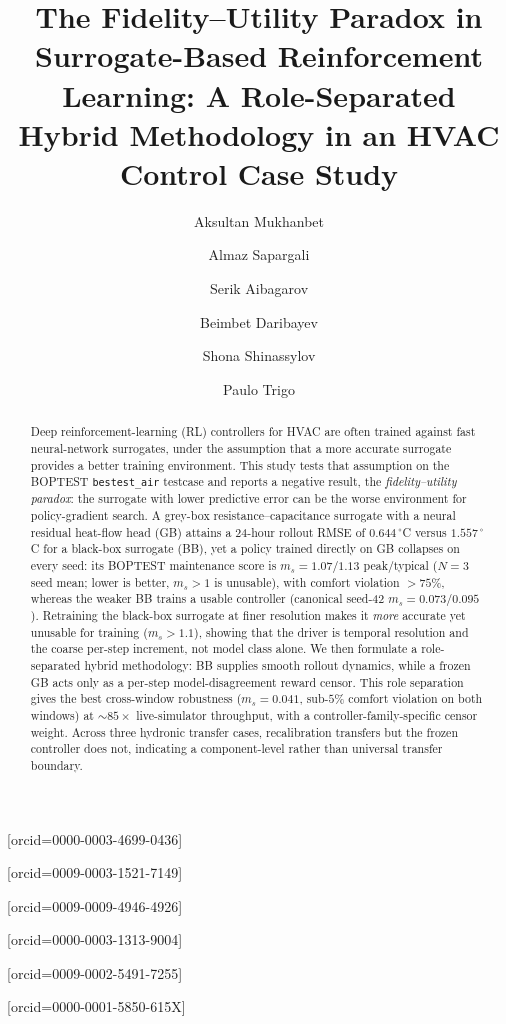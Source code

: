 \documentclass[a4paper,fleqn]{cas-sc}
\begin{document}
\let\WriteBookmarks\relax


\title[mode=title]{The Fidelity--Utility Paradox in Surrogate-Based Reinforcement Learning: A Role-Separated Hybrid Methodology in an HVAC Control Case Study}

\author[1]{Aksultan Mukhanbet}[orcid=0000-0003-4699-0436]
\author[2,1]{Almaz Sapargali}[orcid=0009-0003-1521-7149]
\cormark[1]
\author[2,1]{Serik Aibagarov}[orcid=0009-0009-4946-4926]
\author[3]{Beimbet Daribayev}[orcid=0000-0003-1313-9004]
\author[2,1]{Shona Shinassylov}[orcid=0009-0002-5491-7255]
\author[4]{Paulo Trigo}[orcid=0000-0001-5850-615X]


\begin{abstract}
Deep reinforcement-learning (RL) controllers for HVAC are often trained against fast neural-network surrogates, under the assumption that a more accurate surrogate provides a better training environment. This study tests that assumption on the BOPTEST \texttt{bestest\_air} testcase and reports a negative result, the \emph{fidelity--utility paradox}: the surrogate with lower predictive error can be the worse environment for policy-gradient search. A grey-box resistance--capacitance surrogate with a neural residual heat-flow head (GB) attains a 24-hour rollout RMSE of $0.644\,^{\circ}$C versus $1.557\,^{\circ}$C for a black-box surrogate (BB), yet a policy trained directly on GB collapses on every seed: its BOPTEST maintenance score is $m_s = 1.07$/$1.13$ peak/typical ($N{=}3$ seed mean; lower is better, $m_s > 1$ is unusable), with comfort violation $>75\%$, whereas the weaker BB trains a usable controller (canonical seed-42 $m_s = 0.073$/$0.095$). Retraining the black-box surrogate at finer resolution makes it \emph{more} accurate yet unusable for training ($m_s > 1.1$), showing that the driver is temporal resolution and the coarse per-step increment, not model class alone. We then formulate a role-separated hybrid methodology: BB supplies smooth rollout dynamics, while a frozen GB acts only as a per-step model-disagreement reward censor. This role separation gives the best cross-window robustness ($m_s = 0.041$, sub-$5\%$ comfort violation on both windows) at ${\sim}85\times$ live-simulator throughput, with a controller-family-specific censor weight. Across three hydronic transfer cases, recalibration transfers but the frozen controller does not, indicating a component-level rather than universal transfer boundary.
\end{abstract}
\end{document}
